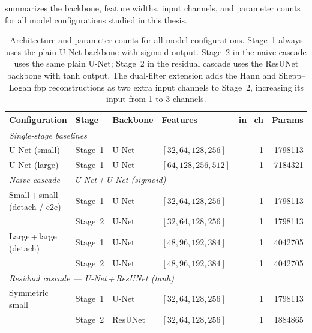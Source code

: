  summarizes the backbone, feature widths, input channels, and parameter counts for all model configurations studied in this thesis.

\clearpage
\begin{table}[!ht]
    \centering
    \caption[Architecture and parameter counts for all studied model configurations.]{%
        Architecture and parameter counts for all model configurations. Stage~1 always uses the plain U-Net backbone with sigmoid output. Stage~2 in the naive cascade uses the same plain U-Net; Stage~2 in the residual cascade uses the ResUNet backbone with tanh output. The dual-filter extension adds the Hann and Shepp--Logan \gls{fbp} reconstructions as two extra input channels to Stage~2, increasing its input from 1 to 3 channels.}
    \label{tab:meth_model_configs}
    \setlength{\tabcolsep}{4pt}
    \small
    \begin{tabular}{@{}llllrr@{}}
        \toprule
        Configuration & Stage & Backbone & Features & in\_ch & Params \\
        \midrule
        \multicolumn{6}{l}{\textit{Single-stage baselines}} \\
        U-Net (small)  & Stage~1 & U-Net   & $[32,64,128,256]$  & 1 & \num{1798113} \\
        U-Net (large)  & Stage~1 & U-Net   & $[64,128,256,512]$ & 1 & \num{7184321} \\
        \midrule
        \multicolumn{6}{l}{\textit{Naive cascade — U-Net\,+\,U-Net (sigmoid)}} \\
        Small\,+\,small (detach / e2e)
                       & Stage~1 & U-Net   & $[32,64,128,256]$  & 1 & \num{1798113} \\
                       & Stage~2 & U-Net   & $[32,64,128,256]$  & 1 & \num{1798113} \\
        Large\,+\,large (detach)
                       & Stage~1 & U-Net   & $[48,96,192,384]$  & 1 & \num{4042705} \\
                       & Stage~2 & U-Net   & $[48,96,192,384]$  & 1 & \num{4042705} \\
        \midrule
        \multicolumn{6}{l}{\textit{Residual cascade — U-Net\,+\,ResUNet (tanh)}} \\
        Symmetric small
                       & Stage~1 & U-Net   & $[32,64,128,256]$  & 1 & \num{1798113} \\
                       & Stage~2 & ResUNet & $[32,64,128,256]$  & 1 & \num{1884865} \\

\end{tabular}
\end{table}
